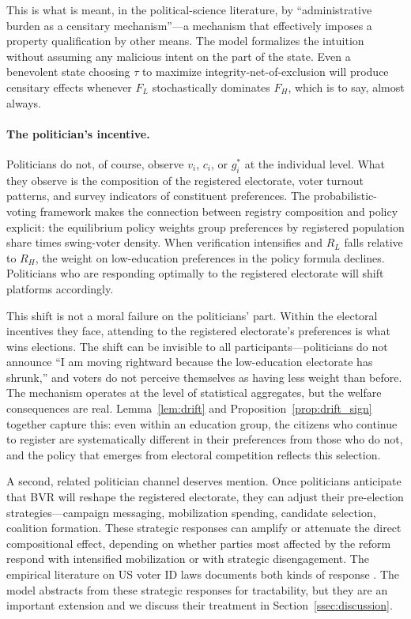 This is what is meant, in the political-science literature, by ``administrative burden as a censitary mechanism''---a mechanism that effectively imposes a property qualification by other means. The model formalizes the intuition without assuming any malicious intent on the part of the state. Even a benevolent state choosing $\tau$ to maximize integrity-net-of-exclusion will produce censitary effects whenever $F_L$ stochastically dominates $F_H$, which is to say, almost always.

\paragraph{The politician's incentive.} Politicians do not, of course, observe $v_i$, $c_i$, or $g_i^*$ at the individual level. What they observe is the composition of the registered electorate, voter turnout patterns, and survey indicators of constituent preferences. The probabilistic-voting framework makes the connection between registry composition and policy explicit: the equilibrium policy weights group preferences by registered population share times swing-voter density. When verification intensifies and $R_L$ falls relative to $R_H$, the weight on low-education preferences in the policy formula declines. Politicians who are responding optimally to the registered electorate will shift platforms accordingly.

This shift is not a moral failure on the politicians' part. Within the electoral incentives they face, attending to the registered electorate's preferences is what wins elections. The shift can be invisible to all participants---politicians do not announce ``I am moving rightward because the low-education electorate has shrunk,'' and voters do not perceive themselves as having less weight than before. The mechanism operates at the level of statistical aggregates, but the welfare consequences are real. Lemma~\ref{lem:drift} and Proposition~\ref{prop:drift_sign} together capture this: even within an education group, the citizens who continue to register are systematically different in their preferences from those who do not, and the policy that emerges from electoral competition reflects this selection.

A second, related politician channel deserves mention. Once politicians anticipate that BVR will reshape the registered electorate, they can adjust their pre-election strategies---campaign messaging, mobilization spending, candidate selection, coalition formation. These strategic responses can amplify or attenuate the direct compositional effect, depending on whether parties most affected by the reform respond with intensified mobilization or with strategic disengagement. The empirical literature on US voter ID laws documents both kinds of response \citep{Hopkins2017, GrimmerYoder2022}. The model abstracts from these strategic responses for tractability, but they are an important extension and we discuss their treatment in Section~\ref{ssec:discussion}.

